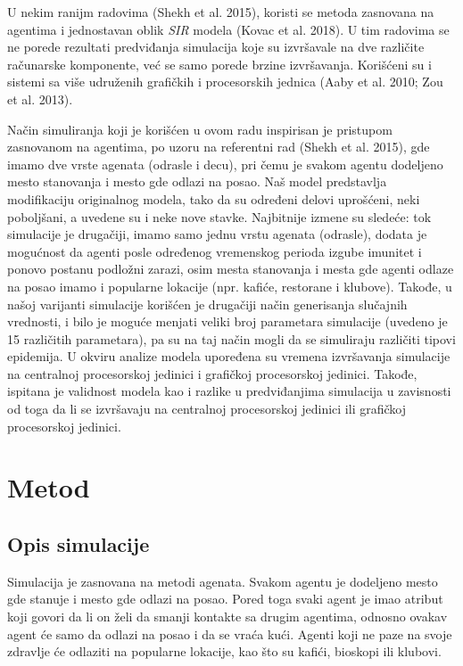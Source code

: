 U nekim ranijm radovima (Shekh et al. 2015), koristi se metoda zasnovana na agentima i jednostavan oblik \emph{SIR} modela (Kovac et al. 2018). U tim radovima se ne porede rezultati predviđanja simulacija koje su izvršavale na dve različite računarske komponente, već se samo porede brzine izvršavanja. Korišćeni su i sistemi sa više udruženih grafičkih i procesorskih jednica (Aaby et al. 2010; Zou et al. 2013).

Način simuliranja koji je korišćen u ovom radu inspirisan je pristupom zasnovanom na agentima, po uzoru na referentni rad (Shekh et al. 2015), gde imamo dve vrste agenata (odrasle i decu), pri čemu je svakom agentu dodeljeno mesto stanovanja i mesto gde odlazi na posao. Naš model predstavlja modifikaciju originalnog modela, tako da su određeni delovi uprošćeni, neki poboljšani, a uvedene su i neke nove stavke. Najbitnije izmene su sledeće: tok simulacije je drugačiji, imamo samo jednu vrstu agenata (odrasle), dodata je mogućnost da agenti posle određenog vremenskog perioda izgube imunitet i ponovo postanu podložni zarazi, osim mesta stanovanja i mesta gde agenti odlaze na posao imamo i popularne lokacije (npr. kafiće, restorane i klubove). Takođe, u našoj varijanti simulacije korišćen je drugačiji način generisanja slučajnih vrednosti, i bilo je moguće menjati veliki broj parametara simulacije (uvedeno je 15 različitih parametara), pa su na taj način mogli da se simuliraju različiti tipovi epidemija. U okviru analize modela upoređena su vremena izvršavanja simulacije na centralnoj procesorskoj jedinici i grafičkoj procesorskoj jedinici. Takođe, ispitana je validnost modela kao i razlike u predviđanjima simulacija u zavisnosti od toga da li se izvršavaju na centralnoj procesorskoj jedinici ili grafičkoj procesorskoj jedinici.

\section{Metod}

\subsection{Opis simulacije}

Simulacija je zasnovana na metodi agenata. Svakom agentu je dodeljeno mesto gde stanuje i mesto gde odlazi na posao. Pored toga svaki agent je imao atribut koji govori da li on želi da smanji kontakte sa drugim agentima, odnosno ovakav agent će samo da odlazi na posao i da se vraća kući. Agenti koji ne paze na svoje zdravlje će odlaziti na popularne lokacije, kao što su kafići, bioskopi ili klubovi.

